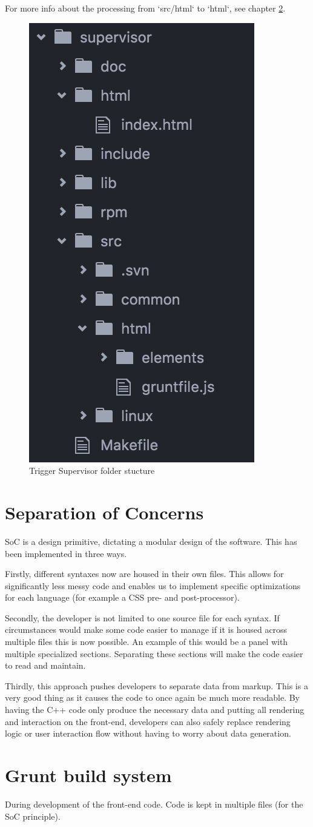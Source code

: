 For more info about the processing from `src/html` to `html`, see chapter \ref{Grunt build system}.
\begin{figure}
  \centering
  \includegraphics[width=.3\textwidth]{images/filetree}
  \caption{Trigger Supervisor folder stucture}
  \label{fig:filetree}
\end{figure}

\section{Separation of Concerns}
\label{Separation of Concerns}
SoC is a design primitive, dictating a modular design of the software. This has
been implemented in three ways.

Firstly, different syntaxes now are housed in their own files. This allows for
significantly less messy code and enables us to implement specific optimizations
for each language (for example a CSS pre- and post-processor).

Secondly, the developer is not limited to one source file for each syntax. If
circumstances would make some code easier to manage if it is housed across
multiple files this is now possible. An example of this would be a panel with
multiple specialized sections. Separating these sections will make the code
easier to read and maintain.

Thirdly, this approach pushes developers to separate data from markup. This is
a very good thing as it causes the code to once again be much more readable.
By having the C++ code only produce the necessary data and putting all rendering
and interaction on the front-end, developers can also safely replace rendering logic or
user interaction flow without having to worry about data generation.

\section{Grunt build system}
\label{Grunt build system}
During development of the front-end code. Code is kept in multiple files (for
the SoC principle).


